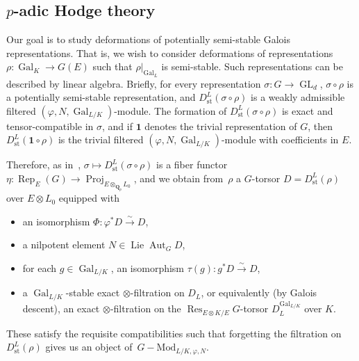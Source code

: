 \documentclass{amsart}
\renewcommand{\mathbb}{\mathbf}
\DeclareMathOperator{\Lie}{Lie}
\newcommand{\To}{\longrightarrow}
\newcommand{\isoto}{\stackrel{\sim}{\To}}
\newcommand{\Rep}{\operatorname{Rep}}
\theoremstyle{definition}
\theoremstyle{remark}
\newcommand{\mar}[1]{}
\newcommand{\mar}[1]{\marginpar{\raggedright\tiny squirrel #1}}
\newcommand{\Q}{\QQ}
\newcommand{\QQ}{{\mathbb Q}}
\newcommand{\Qp}{\Q_p}
\DeclareMathOperator{\Aut}{Aut}
\DeclareMathOperator{\Gal}{Gal}
\DeclareMathOperator{\GL}{GL}
\DeclareMathOperator{\Proj}{Proj}
\newcommand{\st}{\mathrm{st}}
\newcommand{\Res}{\operatorname{Res}}
\begin{document}
\subsection{$p$-adic Hodge theory}\label{subsec: p-adic Hodge
  theory}%
Our goal
is to study deformations of potentially semi-stable Galois
representations.  That is, we wish to consider deformations of
representations $\rho:\Gal_K\rightarrow G(E)$ such that
$\rho|_{\Gal_L}$ is semi-stable.  Such representations can be
described by linear algebra.  
Briefly, for every representation
$\sigma:G\rightarrow\GL_d$, $\sigma\circ\rho$ is a potentially
semi-stable representation, and $D_{\st}^L(\sigma\circ\rho)$ is a
weakly admissible filtered $(\varphi,N,\Gal_{L/K})$-module.  The
formation of $D_{\st}^L(\sigma\circ\rho)$ is exact and
tensor-compatible in $\sigma$, and if $\mathbf{1}$ denotes the trivial
representation of $G$, then $D_{\st}^L(\mathbf{1}\circ\rho)$ is the
trivial filtered $(\varphi,N,\Gal_{L/K})$-module with coefficients in $E$.

Therefore, as in~\cite[\textsection A.2.8-9]{2014arXiv1403.1411B}, $\sigma\mapsto D_{\st}^L(\sigma\circ\rho)$ is a fiber
functor $\eta:\Rep_E(G)\rightarrow \Proj_{E\otimes_{\Qp}L_0}$, and we obtain from~$\rho$ a
$G$-torsor $D=D_{\st}^L(\rho)$ %
over $E\otimes L_0$ equipped with %
\begin{itemize}
\item	an isomorphism $\Phi:\varphi^\ast D\isoto D$,
\item	a nilpotent element $N\in\Lie\Aut_GD$,
\item	for each $g\in\Gal_{L/K}$, an isomorphism $\tau(g):g^\ast D\isoto D$,
\item	a $\Gal_{L/K}$-stable exact $\otimes$-filtration on $D_L$, or equivalently (by Galois descent), an exact $\otimes$-filtration on the $\Res_{E\otimes K/E}G$-torsor $D_L^{\Gal_{L/K}}$ over $K$.
\end{itemize}
These satisfy the requisite compatibilities such that forgetting the filtration on~$D_{\st}^L(\rho)$ gives
us an object of~$G-\mathrm{Mod}_{L/K,\varphi,N}$.
\end{document}
